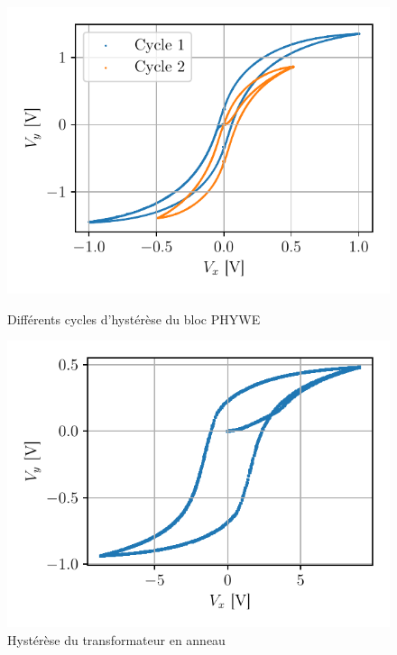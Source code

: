 \begin{figure}[h]
    \begin{minipage}{0.48\linewidth}
        \centering
        \includegraphics[width=\linewidth]{figures/phywe_autres_cycles.pdf}
        \caption{Différents cycles d'hystérèse du bloc PHYWE}
        \label{fig:autres_cycles}
    \end{minipage}
    \hfill
    \begin{minipage}{0.48\linewidth}
        \centering
        \includegraphics[width=\linewidth]{figures/G1-anneau.pdf}
        \caption{Hystérèse du transformateur en anneau}
        \label{fig:anneau}
    \end{minipage}
\end{figure}

